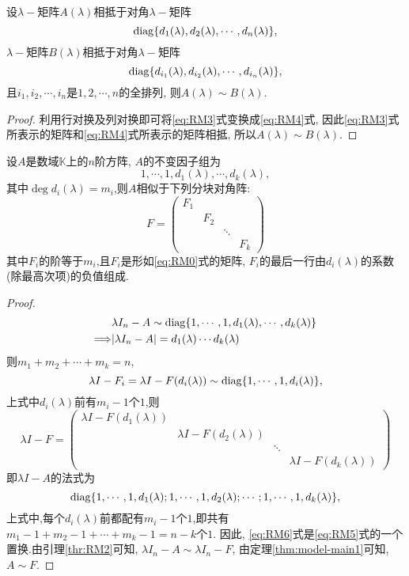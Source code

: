 \begin{theory}\label{thr:RM2}
  设$\lambda-$矩阵$A(\lambda)$相抵于对角$\lambda-$矩阵
  \begin{equation}\label{eq:RM3}
    \operatorname{diag}\{d_1(\lambda),d_2(\lambda),\cdots,d_n(\lambda)\},
  \end{equation}
  $\lambda-$矩阵$B(\lambda)$相抵于对角$\lambda-$矩阵
  \begin{equation}\label{eq:RM4}
    \operatorname{diag}\{d_{i_1}(\lambda),d_{i_2}(\lambda),\cdots,d_{i_n}(\lambda)\},
  \end{equation}
  且$i_1,i_2,\cdots,i_n$是$1,2,\cdots,n$的全排列,
  则$A(\lambda) \sim B(\lambda)$.
\end{theory}
\begin{proof}
  利用行对换及列对换即可将\eqref{eq:RM3}式变换成\eqref{eq:RM4}式,
  因此\eqref{eq:RM3}式所表示的矩阵和\eqref{eq:RM4}式所表示的矩阵相抵,
  所以$A(\lambda) \sim B(\lambda)$.
\end{proof}
\begin{theorem}\label{thm:RM1}
  设$A$是数域$\mathbb{K}$上的$n$阶方阵, $A$的不变因子组为
  \[1,\cdots,1,d_1(\lambda),\cdots,d_k(\lambda),\]
  其中$\deg d_i(\lambda)=m_i$,则$A$相似于下列分块对角阵:
  \[F=
    \begin{pmatrix}
      F_1&&&\\
         &F_2&&\\
         &&\ddots&\\
      &&&F_k
    \end{pmatrix}\]
  其中$F_i$的阶等于$m_i$,且$F_i$是形如\eqref{eq:RM0}式的矩阵, 
  $F_i$的最后一行由$d_i(\lambda)$的系数(除最高次项)的负值组成.
\end{theorem}
\begin{proof}
  \begin{align}
    & \lambda I_n-A \sim \operatorname{diag}\{1,\cdots,1,d_1(\lambda),\cdots,d_k(\lambda)\}\label{eq:RM5}\\
      \Longrightarrow & |\lambda I_n-A|=d_1(\lambda)\cdots d_k(\lambda)\notag
  \end{align}
  则$m_1+m_2+\cdots+m_k=n$, 
  \[\lambda I-F_i=\lambda I-F(d_i(\lambda)) \sim
    \operatorname{diag}\{1,\cdots,1,d_i(\lambda)\},\]
  上式中$d_i(\lambda)$前有$m_i-1$个$1$,则
  \[\lambda I-F=
    \begin{pmatrix}
      \lambda I-F(d_1(\lambda))&&&\\
                               &\lambda I-F(d_2(\lambda))&&\\
                               &&\ddots&\\
      &&&\lambda I-F(d_k(\lambda))
    \end{pmatrix}\]
  即$\lambda I -A$的法式为
  \begin{equation}\label{eq:RM6}
    \operatorname{diag}\{1,\cdots,1,d_1(\lambda);1,\cdots,1,d_2(\lambda);\cdots;1,\cdots,1,d_k(\lambda)\},
  \end{equation}
  上式中,每个$d_i(\lambda)$前都配有$m_i-1$个$1$,即共有$m_1-1+m_2-1+\cdots+m_k-1=n-k$个$1$.
  因此, \eqref{eq:RM6}式是\eqref{eq:RM5}式的一个置换.由引理\ref{thr:RM2}可知,
  $\lambda I_n-A \sim \lambda I_n-F$,
  由定理\ref{thm:model-main1}可知,
  $A \sim F$.
\end{proof}
